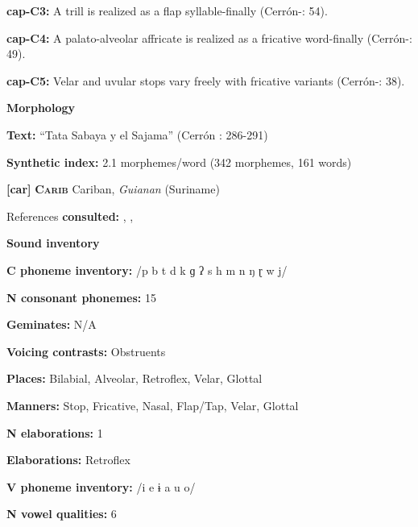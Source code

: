 \textbf{cap-C3:} A trill is realized as a flap syllable-finally (Cerrón-\citealt{Palomino2006}: 54).



\textbf{cap-C4:} A palato-alveolar affricate is realized as a fricative word-finally (Cerrón-\citealt{Palomino2006}: 49).



\textbf{cap-C5:} Velar and uvular stops vary freely with fricative variants (Cerrón-\citealt{Palomino2006}: 38).



\textbf{Morphology}



\textbf{Text:} “Tata Sabaya y el Sajama” (Cerrón \citealt{Palomino2006}: 286-291)



\textbf{Synthetic index:} 2.1 morphemes/word (342 morphemes, 161 words)



\textbf{[car]}   \textbf{\textsc{Carib}  }  Cariban, \textit{Guianan} (Suriname)



References \textbf{consulted:} \citet{Courtz2008}, \citet{Hoff1968}, \citet{Peasgood1972}



\textbf{Sound inventory}



\textbf{C phoneme inventory:} /p b t d k ɡ ʔ s h m n ŋ ɽ w j/



\textbf{N consonant phonemes:} 15



\textbf{Geminates:} N/A



\textbf{Voicing contrasts:} Obstruents



\textbf{Places:} Bilabial, Alveolar, Retroflex, Velar, Glottal



\textbf{Manners:} Stop, Fricative, Nasal, Flap/Tap, Velar, Glottal



\textbf{N elaborations:} 1



\textbf{Elaborations:} Retroflex



\textbf{V phoneme inventory:} /i e ɨ a u o/



\textbf{N vowel qualities:} 6



